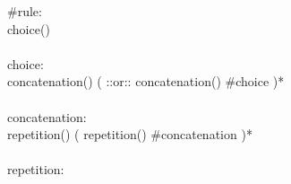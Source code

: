 \begin{figure}

\begin{bigbigpre}
 \\
 \\
 \\
 \\
 \\
#rule: \\
    choice() \\
 \\
choice: \\
    concatenation() ( ::or:: concatenation() #choice )* \\
 \\
concatenation: \\
    repetition() ( repetition() #concatenation )* \\
 \\
repetition: \\

\end{bigbigpre}
\end{figure}
